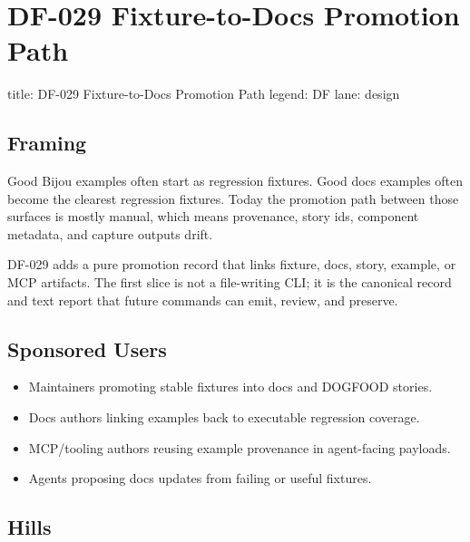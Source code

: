 \chapter{DF-029 Fixture-to-Docs Promotion Path}\label{record-090}

\smallskip

\begin{RecordMeta}
title: DF-029 Fixture-to-Docs Promotion Path
legend: DF
lane: design

\end{RecordMeta}

\section{Framing}\label{record-090-framing}

Good Bijou examples often start as regression fixtures. Good docs examples often become the clearest regression fixtures. Today the promotion path between those surfaces is mostly manual, which means provenance, story ids, component metadata, and capture outputs drift.

DF-029 adds a pure promotion record that links fixture, docs, story, example, or MCP artifacts. The first slice is not a file-writing CLI; it is the canonical record and text report that future commands can emit, review, and preserve.

\section{Sponsored Users}\label{record-090-sponsored-users}

\begin{itemize}
\tightlist
\item
  Maintainers promoting stable fixtures into docs and DOGFOOD stories.
\item
  Docs authors linking examples back to executable regression coverage.
\item
  MCP/tooling authors reusing example provenance in agent-facing payloads.
\item
  Agents proposing docs updates from failing or useful fixtures.
\end{itemize}

\section{Hills}\label{record-090-hills}

